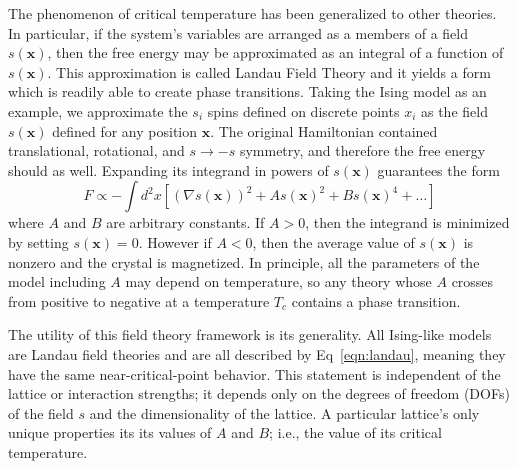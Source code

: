 \documentclass[
  amsmath,
  amssymb,
  aps,
  twocolumn,
  nofootinbib,
  nolongbibliography,
  floatfix,
]{revtex4-2}
\newcommand{\brackets}[1]{\left [ #1 \right ]}
\begin{document}
The phenomenon of critical temperature has been generalized to other theories. In particular, if the system's variables are arranged as a members of a field $s(\bm x)$, then the free energy may be approximated as an integral of a function of $s(\bm x)$. This approximation is called Landau Field Theory and it yields a form which is readily able to create phase transitions. Taking the Ising model as an example, we approximate the $s_i$ spins defined on discrete points $x_i$ as the field $s(\bm x)$ defined for any position $\bm x$. The original Hamiltonian contained translational, rotational, and $s\rightarrow-s$ symmetry, and therefore the free energy should as well. Expanding its integrand in powers of $s(\bm x)$ guarantees the form
\begin{equation}
F \propto -\int d^2 x \brackets{(\nabla s(\bm x))^2 + A s(\bm x)^2 + B s(\bm x)^4 + \dots}
\label{eqn:landau}
\end{equation}
where $A$ and $B$ are arbitrary constants. If $A>0$, then the integrand is minimized by setting $s(\bm x)=0$. However if $A<0$, then the average value of $s(\bm x)$ is nonzero and the crystal is magnetized. In principle, all the parameters of the model including $A$ may depend on temperature, so any theory whose $A$ crosses from positive to negative at a temperature $T_c$ contains a phase transition. 

The utility of this field theory framework is its generality. All Ising-like models are Landau field theories and are all described by Eq~\ref{eqn:landau}, meaning they have the same near-critical-point behavior. This statement is independent of the lattice or interaction strengths; it depends only on the degrees of freedom (DOFs) of the field $s$ and the dimensionality of the lattice. A particular lattice's only unique properties its its values of $A$ and $B$; i.e., the value of its critical temperature.

\end{document}
